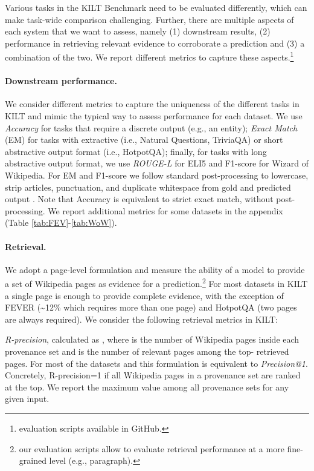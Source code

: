 \documentclass[11pt]{article}
\begin{document}
Various tasks in the KILT Benchmark need to be evaluated differently, which can make task-wide comparison challenging. 
Further, there are multiple aspects of each system that we want to assess, namely (1) downstream results, (2) performance in retrieving relevant evidence to corroborate a prediction and (3) a combination of the two.
We report different metrics to capture these aspects.\footnote{evaluation scripts available in GitHub.}


\paragraph{Downstream performance.}
We consider different metrics to capture the uniqueness of the different tasks in KILT and mimic the typical way to assess performance for each dataset. 
We use \textit{Accuracy} for tasks that require a discrete output (e.g., an entity); \textit{Exact Match} (EM) for tasks with extractive (i.e., Natural Questions, TriviaQA) or short abstractive output format (i.e., HotpotQA); finally, for tasks with long abstractive output format, we use \textit{ROUGE-L} \cite{lin2004rouge} for ELI5 and F1-score for Wizard of Wikipedia.
For EM and F1-score we follow standard post-processing to lowercase, strip articles, punctuation, and duplicate whitespace from gold and predicted output \cite{rajpurkar2016squad}. Note that Accuracy is equivalent to strict exact match, without post-processing. We report additional metrics for some datasets in the appendix (Table \ref{tab:FEV}-\ref{tab:WoW}).


\paragraph{Retrieval.}
We adopt a page-level formulation and measure the ability of a model to provide a set of Wikipedia pages as evidence for a prediction.\footnote{our evaluation scripts allow to evaluate retrieval performance at a more fine-grained level (e.g., paragraph).}
For most datasets in KILT a single page is enough to provide complete evidence, with the exception of FEVER (\textasciitilde12\% which requires more than one page) and HotpotQA (two pages are always required).
We consider the following retrieval metrics in KILT:


\emph{R-precision}, calculated as , where  is the number of Wikipedia pages inside each provenance set and  is the number of relevant pages among the top- retrieved pages. For most of the datasets  and this formulation is equivalent to \emph{Precision@1}. Concretely, R-precision=1 if all Wikipedia pages in a provenance set are ranked at the top. We report the maximum value among all provenance sets for any given input.
\end{document}

